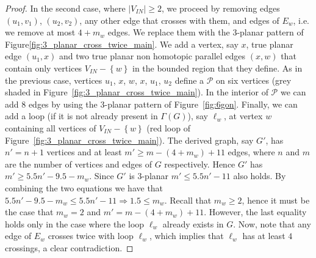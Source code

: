 \begin{proof}
In the second case, where $|V_{IN}|\geq 2$, we proceed by removing edges $(u_1,v_1)$, $(u_2,v_2)$, any other edge that crosses with them, and edges of $E_w$, i.e. we remove at most $4+m_w$ edges. We replace them with the $3$-planar pattern of Figure\ref{fig:3_planar_cross_twice_main}. We add a vertex, say $x$, true planar edge $(u_1,x)$ and two true planar non homotopic parallel edges $(x,w)$ that contain only vertices $V_{IN}-\left\{w\right\}$ in the bounded region that they define. As in the previous case, vertices $u_1$, $x$, $w$, $x$, $u_1$, $u_2$ define a \pp $\mathcal{P}$ on six vertices (grey shaded in Figure~\ref{fig:3_planar_cross_twice_main}). In the interior of $\mathcal{P}$ we can add $8$ edges by using the $3$-planar pattern of Figure~\ref{fig:6gon}. Finally, we can add a loop (if it is not already present in $\Gamma(G)$), say $\ell_w$,  at vertex $w$ containing all vertices of $V_{IN}-\left\{w\right\}$ (red loop of Figure~\ref{fig:3_planar_cross_twice_main}). The derived graph, say $G'$, has $n'=n+1$ vertices and at least $m'\geq m-(4+m_w)+11$ edges, where $n$ and $m$ are the number of vertices and edges of $G$ respectively. Hence $G'$ has $m'\geq 5.5n'-9.5-m_w$. Since $G'$ is $3$-planar $m'\leq 5.5n'-11$ also holds. By combining the two equations we have that $5.5n'-9.5-m_w\leq 5.5n'-11\Rightarrow 1.5\leq m_w$. Recall that $m_w\geq 2$, hence it must be the case that $m_w=2$ and $m'= m-(4+m_w)+11$. However, the last equality holds only in the case where the loop $\ell_w$ already exists in $G$. Now, note that any edge of $E_w$ crosses twice with loop $\ell_w$, which implies that $\ell_w$ has at least $4$ crossings, a clear contradiction.
\end{proof}

